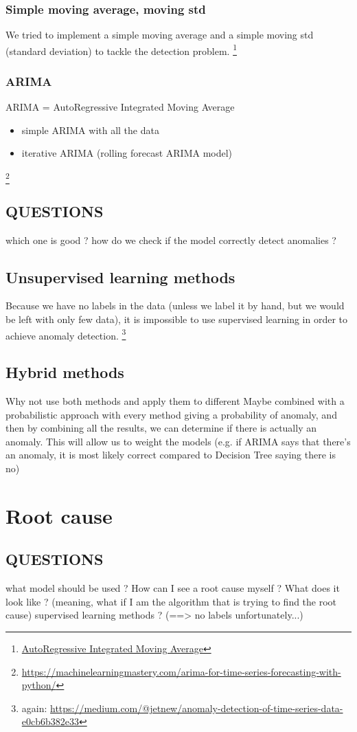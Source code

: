 \documentclass{article}
\begin{document}
        \subsubsection{Simple moving average, moving std}
            We tried to implement a simple moving average and a simple moving std (standard deviation) to tackle the detection problem.
            \footnote{\url{AutoRegressive Integrated Moving Average}}

        \subsubsection{ARIMA}
            ARIMA = AutoRegressive Integrated Moving Average
            \begin{itemize}
                \item simple ARIMA with all the data
                \item iterative ARIMA (rolling forecast ARIMA model)
            \end{itemize}
            \footnote{\url{https://machinelearningmastery.com/arima-for-time-series-forecasting-with-python/}}

    \subsection{QUESTIONS}
    which one is good ?
    how do we check if the model correctly detect anomalies ?

    \subsection{Unsupervised learning methods}
    Because we have no labels in the data (unless we label it by hand, but we would be left with only few data), it is impossible to use supervised learning in order to achieve anomaly detection.
    \footnote{again: \url{https://medium.com/@jetnew/anomaly-detection-of-time-series-data-e0cb6b382e33}}


    \subsection{Hybrid methods}
    Why not use both methods and apply them to different 
    Maybe combined with a probabilistic approach with every method giving a probability of anomaly, and then by combining all the results, we can determine if there is actually an anomaly. This will allow us to weight the models (e.g. if ARIMA says that there's an anomaly, it is most likely correct compared to Decision Tree saying there is no)

\section{Root cause}
    \subsection{QUESTIONS}
    what model should be used ?
    How can I see a root cause myself ? What does it look like ? (meaning, what if I am the algorithm that is trying to find the root cause)
    supervised learning methods ? (==> no labels unfortunately...)
            
\end{document}
